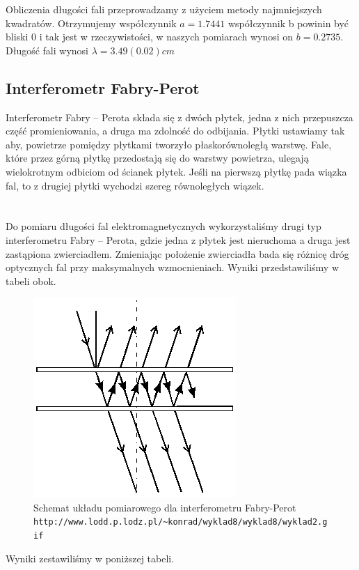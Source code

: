 \documentclass[a4paper]{article}
\newlength{\du}
\begin{document}
Obliczenia długości fali przeprowadzamy z użyciem metody najmniejszych kwadratów. Otrzymujemy współczynnik $a = 1.7441$ współczynnik b powinin być bliski 0 i tak jest w rzeczywistości, w naszych pomiarach wynosi on $b=0.2735$. Długość fali wynosi $\lambda = 3.49(0.02)cm$


\subsection{Interferometr Fabry-Perot}
Interferometr Fabry – Perota składa się z dwóch płytek, jedna z nich przepuszcza część promieniowania, a druga ma zdolność do odbijania. Płytki ustawiamy tak aby, powietrze pomiędzy płytkami tworzyło płaskorównoległą warstwę. Fale, które przez górną płytkę przedostają się do warstwy powietrza, ulegają wielokrotnym odbiciom od ścianek płytek. Jeśli na pierwszą płytkę pada wiązka fal, to z drugiej płytki wychodzi szereg równoległych wiązek. 
\\
\\
\\
Do pomiaru długości fal elektromagnetycznych wykorzystaliśmy drugi typ interferometru Fabry – Perota, gdzie jedna z płytek jest nieruchoma a druga jest zastąpiona zwierciadłem. Zmieniając położenie zwierciadła bada się różnicę dróg optycznych fal przy maksymalnych wzmocnieniach. Wyniki przedstawiliśmy w tabeli obok.

\begin{figure}[h!]
\centering
\includegraphics[scale=0.7]{fabry_perot.png}
\caption{Schemat układu pomiarowego dla interferometru Fabry-Perot \texttt{http://www.lodd.p.lodz.pl/\textasciitilde konrad/wyklad8/wyklad8/wyklad2.gif}}
\label{fabry_perot}
\end{figure}

Wyniki zestawiliśmy w poniższej tabeli. 
\end{document}
